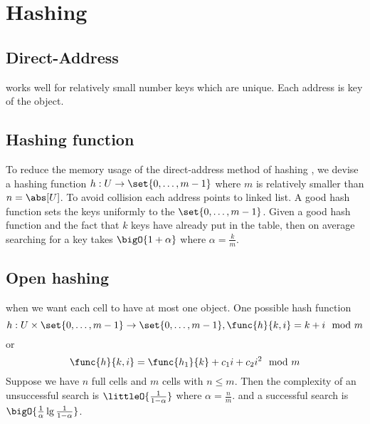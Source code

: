 \chapter{Hashing}
\section{Direct-Address}
works well for relatively small number keys which are unique. Each address is key of the object.
\section{Hashing function}
To reduce the memory usage of the direct-address method of hashing , we devise a hashing function \(h : U \to \set{0,\dots, m-1}\) where \(m\) is relatively smaller than \(n =\abs[U]\).
To avoid collision each address points to linked list. A good hash function sets the keys uniformly to the \(\set{0, \dots, m-1}\).
Given a good hash function and the fact that \(k\) keys have already put in the table, then on average searching for a key takes \(\bigO{1 + \alpha}\) where  \(\alpha = \frac{k}{m}\).
\section{Open hashing}
when we want each cell to have at most one object. One possible hash function
\begin{equation*}
    h : U \times \set{0, \dots , m-1} \to \set{0 , \dots , m-1}, \func{h}{k,i} = k + i \mod{m}
\end{equation*}
or
\begin{equation*}
    \func{h}{k,i} = \func{h_1}{k} + c_1 i + c_2 i^2 \mod{m}
\end{equation*}
Suppose we have \(n\) full cells and \(m\) cells with \(n \leq m\). Then the complexity of an unsuccessful search is \(\littleO{\frac{1}{1 - \alpha}}\) where \(\alpha = \frac{n}{m}\). and a successful search is
\(\bigO{\frac{1}{\alpha} \lg \frac{1}{1 - \alpha}}\).